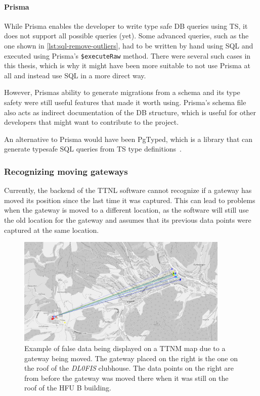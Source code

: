 \paragraph{Prisma}

While Prisma enables the developer to write type safe \ac{DB} queries using \ac{TS}, it does not support all possible queries (yet).
Some advanced queries, such as the one shown in \cref{lst:sql-remove-outliers}, had to be written by hand using \ac{SQL} and executed using Prisma's \lstinline|$executeRaw| method.
There were several such cases in this thesis, which is why it might have been more suitable to not use Prisma at all and instead use \ac{SQL} in a more direct way.

However, Prismas ability to generate migrations from a schema and its type safety were still useful features that made it worth using.
Prisma's schema file also acts as indirect documentation of the \ac{DB} structure, which is useful for other developers that might want to contribute to the project.

An alternative to Prisma would have been PgTyped, which is a library that can generate typesafe \ac{SQL} queries from \ac{TS} type definitions~\cite{salakh_pgtyped_2023}.

\subsubsection{Recognizing moving gateways}

Currently, the backend of the \ac{TTNL} software cannot recognize if a gateway has moved its position since the last time it was captured.
This can lead to problems when the gateway is moved to a different location, as the software will still use the old location for the gateway and assumes that its previous data
points were captured at the same location.

\begin{figure}[htbp]
    \centering
    \includegraphics[width=0.9\textwidth]{pictures/ttn-mapper/moved_gateway_example.png}
    \caption{
        Example of false data being displayed on a \acl{TTNM} map due to a gateway being moved.
        The gateway placed on the right is the one on the roof of the \emph{DL0FIS} clubhouse.
        The data points on the right are from before the gateway was moved there when it was still on the roof of the \ac{HFU} B building.
    }\label{pic:gateway-moved-example}
\end{figure}

